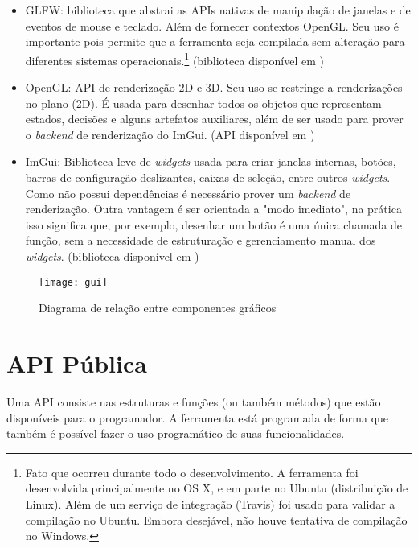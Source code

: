 \begin{itemize}
  \item GLFW: biblioteca que abstrai as APIs nativas de manipulação de janelas e
    de eventos de mouse e teclado.  Além de fornecer contextos OpenGL.  Seu uso
    é importante pois permite que a ferramenta seja compilada sem alteração para
    diferentes sistemas operacionais.\footnote{Fato que ocorreu durante todo o
      desenvolvimento.  A ferramenta foi desenvolvida principalmente no OS X, e
      em parte no Ubuntu (distribuição de Linux).  Além de um serviço de
      integração (Travis) foi usado para validar a compilação no Ubuntu.  Embora
    desejável, não houve tentativa de compilação no Windows.} (biblioteca
    disponível em \cite{glfwdocs})
  \item OpenGL: API de renderização 2D e 3D.  Seu uso se restringe a
    renderizações no plano (2D).  É usada para desenhar todos os objetos que
    representam estados, decisões e alguns artefatos auxiliares, além de ser
    usado para prover o \textit{backend} de renderização do ImGui. (API
    disponível em \cite{opengldocs})
  \item ImGui: Biblioteca leve de \textit{widgets} usada para criar janelas
    internas, botões, barras de configuração deslizantes, caixas de seleção,
    entre outros \textit{widgets}.  Como não possui dependências é necessário
    prover um \textit{backend} de renderização.  Outra vantagem é ser orientada
    a "modo imediato", na prática isso significa que, por exemplo, desenhar um
    botão é uma única chamada de função, sem a necessidade de estruturação e
    gerenciamento manual dos \textit{widgets}. (biblioteca disponível em
    \cite{imguigithub})
\end{itemize}

\begin{figure}[H]
  \centering
  \texttt{[image: gui]}
  \caption{Diagrama de relação entre componentes gráficos}\label{fig:arch_gui}
\end{figure}


\section{API Pública}


Uma API consiste nas estruturas e funções (ou também métodos) que estão
disponíveis para o programador.  A ferramenta está programada de forma que
também é possível fazer o uso programático de suas funcionalidades.


